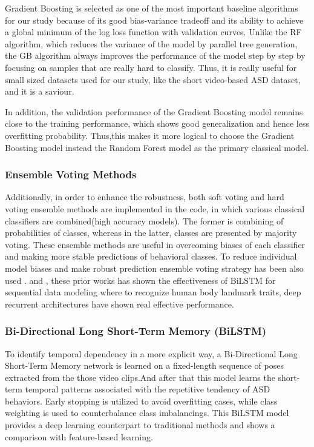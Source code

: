 Gradient Boosting is selected as one of the most important baseline algorithms for our study because of its good bias-variance tradeoff and its ability to achieve a global minimum of the log loss function with validation curves. Unlike the RF algorithm, which reduces the variance of the model by parallel tree generation, the GB algorithm always improves the performance of the model step by step by focusing on samples that are really hard to classify. Thus, it is really useful for small sized datasets used for our study, like the short video-based ASD dataset, and it is a saviour.

In addition, the validation performance of the Gradient Boosting model remains close to the training performance, which shows good generalization and hence less overfitting probability. Thus,this makes it more logical to choose the Gradient Boosting model instead the Random Forest model as the primary classical model.

\subsubsection{Ensemble Voting Methods}
Additionally, in order to enhance the robustness, both soft voting and hard voting ensemble methods are implemented in the code, in which various classical classifiers are combined(high accuracy models). The former is combining of probabilities of classes, whereas in the latter, classes are presented by majority voting. These ensemble methods are useful in overcoming biases of each classifier and making more stable predictions of behavioral classes. To reduce individual model biases and make robust prediction ensemble voting strategy has been also used \cite{rajpurkar2022ai}.\cite{ordonez2016deep} and \cite{zhao2020bidirectional}, these prior works has shown the effectiveness of BiLSTM for sequential data modeling where to recognize human body landmark traits, deep recurrent architectures have shown real effective performance.

\subsubsection{Bi-Directional Long Short-Term Memory (BiLSTM)}
To identify temporal dependency in a more explicit way, a Bi-Directional Long Short-Term Memory network is learned on a fixed-length sequence of poses extracted from the those video clips.And after that this model learns the short-term temporal patterns associated with the repetitive tendency of ASD behaviors. Early stopping is utilized to avoid overfitting cases, while class weighting is used to counterbalance class imbalancings. This BiLSTM model provides a deep learning counterpart to traditional methods and shows a comparison with feature-based learning.

